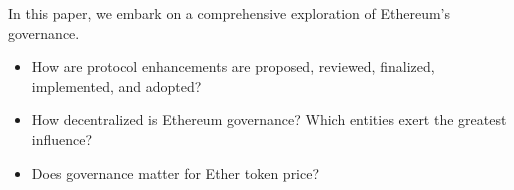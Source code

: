\documentclass[12pt]{beamer}
\newcommand\fitem{\vfill\item}
\begin{document}

\begin{frame}[fragile]{In this paper, we embark on a comprehensive exploration of Ethereum's governance.}

\begin{itemize}
    \fitem  How are protocol enhancements are proposed, reviewed, finalized, implemented, and adopted? 
    \fitem How decentralized is Ethereum governance? Which entities exert the greatest influence? 
    \fitem Does governance matter for Ether token price?
\end{itemize}

\end{frame}

\end{document}
